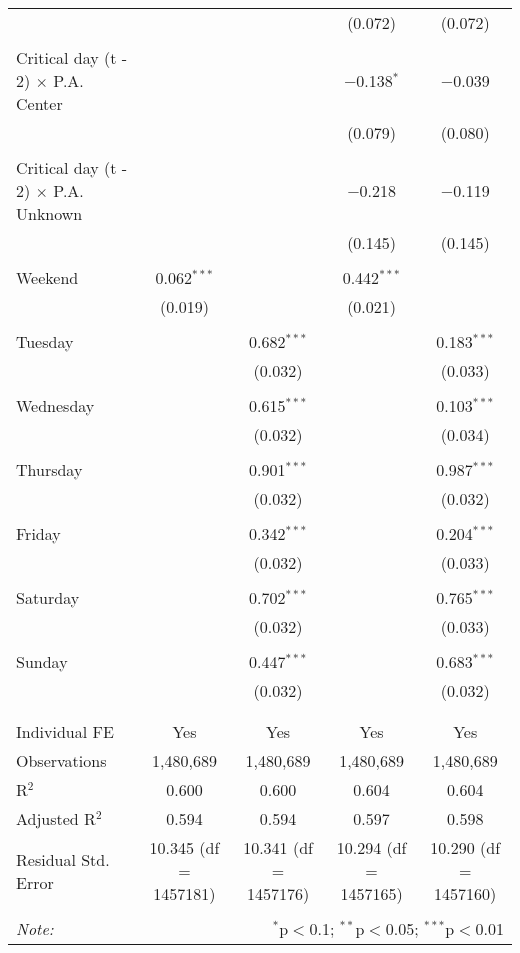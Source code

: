 \documentclass[
]{article}
\begin{document}
\begin{table}[!htbp]
{\begin{tabular}{@{\extracolsep{5pt}}lcccc}
  &  &  & (0.072) & (0.072) \\ 
  & & & & \\ 
 Critical day (t - 2) $\times$ P.A. Center &  &  & $-$0.138$^{*}$ & $-$0.039 \\ 
  &  &  & (0.079) & (0.080) \\ 
  & & & & \\ 
 Critical day (t - 2) $\times$ P.A. Unknown &  &  & $-$0.218 & $-$0.119 \\ 
  &  &  & (0.145) & (0.145) \\ 
  & & & & \\ 
 Weekend & 0.062$^{***}$ &  & 0.442$^{***}$ &  \\ 
  & (0.019) &  & (0.021) &  \\ 
  & & & & \\ 
 Tuesday &  & 0.682$^{***}$ &  & 0.183$^{***}$ \\ 
  &  & (0.032) &  & (0.033) \\ 
  & & & & \\ 
 Wednesday &  & 0.615$^{***}$ &  & 0.103$^{***}$ \\ 
  &  & (0.032) &  & (0.034) \\ 
  & & & & \\ 
 Thursday &  & 0.901$^{***}$ &  & 0.987$^{***}$ \\ 
  &  & (0.032) &  & (0.032) \\ 
  & & & & \\ 
 Friday &  & 0.342$^{***}$ &  & 0.204$^{***}$ \\ 
  &  & (0.032) &  & (0.033) \\ 
  & & & & \\ 
 Saturday &  & 0.702$^{***}$ &  & 0.765$^{***}$ \\ 
  &  & (0.032) &  & (0.033) \\ 
  & & & & \\ 
 Sunday &  & 0.447$^{***}$ &  & 0.683$^{***}$ \\ 
  &  & (0.032) &  & (0.032) \\ 
  & & & & \\ 
\hline \\[-1.8ex] 
Individual FE & Yes & Yes & Yes & Yes \\ 
Observations & 1,480,689 & 1,480,689 & 1,480,689 & 1,480,689 \\ 
R$^{2}$ & 0.600 & 0.600 & 0.604 & 0.604 \\ 
Adjusted R$^{2}$ & 0.594 & 0.594 & 0.597 & 0.598 \\ 
Residual Std. Error & 10.345 (df = 1457181) & 10.341 (df = 1457176) & 10.294 (df = 1457165) & 10.290 (df = 1457160) \\ 
\hline 
\hline \\[-1.8ex] 
\textit{Note:}  & \multicolumn{4}{r}{$^{*}$p$<$0.1; $^{**}$p$<$0.05; $^{***}$p$<$0.01} \\ 
\end{tabular}
} 
\end{table} 
\newpage
\end{document}
